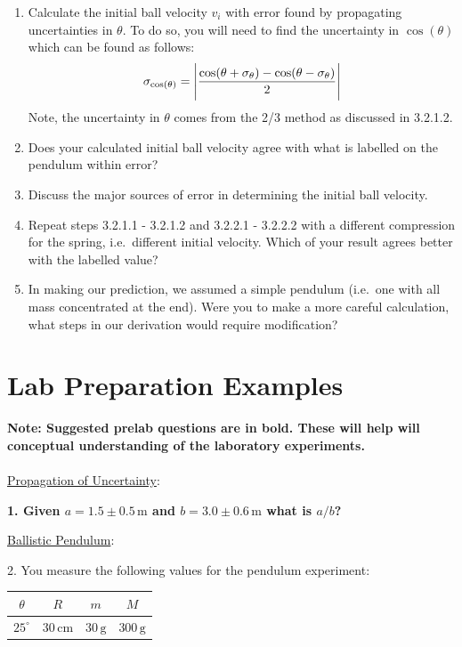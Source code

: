 \begin{enumerate}
    \item Calculate the initial ball velocity $v_{i}$ with error found by propagating uncertainties in $\theta$. To do so, you will need to find the uncertainty in $\cos(\theta)$ which can be found as follows:
\begin{gather}
\sigma_{\cos(\theta)} = \Bigg{|}\frac{\cos(\theta + \sigma_\theta) - \cos(\theta - \sigma_\theta)}{2} \Bigg{|}
\end{gather}
Note, the uncertainty in $\theta$ comes from the 2/3 method as discussed in 3.2.1.2.
\item Does your calculated initial ball velocity agree with what is labelled on the pendulum within error? 
\item Discuss the major sources of error in determining the initial ball velocity.
    \item Repeat steps 3.2.1.1 - 3.2.1.2 and 3.2.2.1 - 3.2.2.2 with a different compression for the spring, i.e.\ different initial velocity. Which of your result agrees better with the labelled value? %
    \item In making our prediction, we assumed a simple pendulum (i.e.\ one with all mass concentrated at the end).  Were you to make a more careful calculation, what steps in our derivation would require modification?
\end{enumerate}

\section{Lab Preparation Examples}
{\bf{Note: Suggested prelab questions are in bold. These will help will conceptual understanding of the laboratory experiments.}}
\\
\\
\noindent\underline{Propagation of Uncertainty}:\myskip

{\bf{1. Given $a = 1.5 \pm 0.5\, \textrm{m}$ and $b = 3.0 \pm 0.6\, \textrm{m}$ what is $a/b$?}}\myskip

\noindent\underline{Ballistic Pendulum}:\myskip

2. You measure the following values for the pendulum experiment:
\begin{table}[h]
  \centering
  \begin{tabular}{|c|c|c|c|}
    \hline
    $\theta$&$R$&$m$&$M$\\
    \hline
    $25^\circ$ & $30\,\mathrm{cm}$ & $30\,\textrm{g}$ & $300\,\textrm{g}$\\
    \hline
  \end{tabular}
\end{table}

